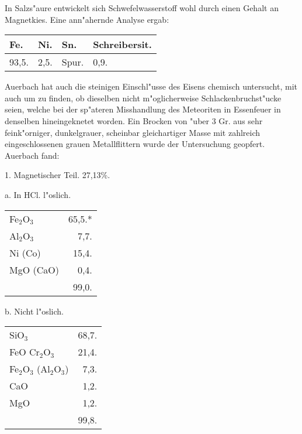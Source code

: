 \documentclass[a4paper, 11pt, oneside]{article}
\begin{document}
In Salzs"aure entwickelt sich Schwefelwasserstoff wohl durch einen Gehalt an Magnetkies. Eine ann"ahernde Analyse ergab:
\begin{table}[H]
    \centering\swabfamily\Large
    \begin{tabular}{l l l l}
        Fe. & Ni. & Sn. & Schreibersit. \\ \hline
        93,5. & 2,5. & Spur. & 0,9. \\
    \end{tabular}
\end{table}

Auerbach hat auch die steinigen Einschl"usse des Eisens chemisch untersucht, mit auch um zu finden, ob dieselben nicht m"oglicherweise Schlackenbruchst"ucke seien, welche bei der sp"ateren Misshandlung des Meteoriten in Essenfeuer in denselben hineingeknetet worden. Ein Brocken von "uber 3 Gr. aus sehr feink"orniger, dunkelgrauer, scheinbar gleichartiger Masse mit zahlreich eingeschlossenen grauen Metallflittern wurde der Untersuchung geopfert. Auerbach fand:
\begin{center}
1. Magnetischer Teil. 27,13\%.  
\end{center}

\begin{center}
a. In HCl. l"oslich.
\end{center}

\begin{table}[H]
    \centering\swabfamily\Large
    \begin{tabular}{l r}
        Fe$_{2}$O$_{3}$ & 65,5.* \\
        Al$_{2}$O$_{3}$ & 7,7. \\
        Ni (Co) & 15,4. \\
        MgO (CaO) & 0,4. \\
         & 99,0. \\
    \end{tabular}
\end{table}

\begin{center}
b. Nicht l"oslich.  
\end{center}

\begin{table}[H]
    \centering\swabfamily\Large
    \begin{tabular}{l r}
        SiO$_{3}$ & 68,7. \\
        FeO Cr$_{2}$O$_{3}$ & 21,4. \\
        Fe$_{2}$O$_{3}$ (Al$_{2}$O$_{3}$)  & 7,3. \\
        CaO & 1,2. \\
        MgO & 1,2. \\
         & 99,8. \\
    \end{tabular}
\end{table}
\end{document}
